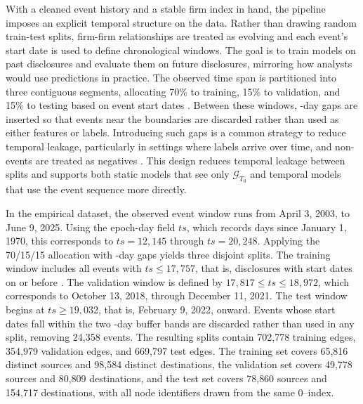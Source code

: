 With a cleaned event history and a stable firm index in hand, the pipeline imposes an explicit temporal structure on the data. Rather than drawing random train-test splits, firm-firm relationships are treated as evolving and each event's start date is used to define chronological windows. The goal is to train models on past disclosures and evaluate them on future disclosures, mirroring how analysts would use predictions in practice. The observed time span is partitioned into three contiguous segments, allocating 70\% to training, 15\% to validation, and 15\% to testing based on event start dates \parencite{goodfellow_deep_2016,xu_inductive_2020}. Between these windows, \InterSplitGap-day gaps are inserted so that events near the boundaries are discarded rather than used as either features or labels. Introducing such gaps is a common strategy to reduce temporal leakage, particularly in settings where labels arrive over time, and non-events are treated as negatives \parencite{bekker_learning_2020}. This design reduces temporal leakage between splits and supports both static models that see only \(\mathcal{G}_{T_0}\) and temporal models that use the event sequence more directly.

In the empirical dataset, the observed event window runs from April 3, 2003, to June 9, 2025. Using the epoch-day field \(\mathit{ts}\), which records days since January 1, 1970, this corresponds to \(\mathit{ts}=12{,}145\) through \(\mathit{ts}=20{,}248\). Applying the 70/15/15 allocation with \InterSplitGap-day gaps yields three disjoint splits. The training window includes all events with \(\mathit{ts} \le 17{,}757\), that is, disclosures with start dates on or before \TrainCutoffDate. The validation window is defined by \(17{,}817 \le \mathit{ts} \le 18{,}972\), which corresponds to October 13, 2018, through December 11, 2021. The test window begins at \(\mathit{ts} \ge 19{,}032\), that is, February 9, 2022, onward. Events whose start dates fall within the two \InterSplitGap-day buffer bands are discarded rather than used in any split, removing 24{,}358 events. The resulting splits contain 702{,}778 training edges, 354{,}979 validation edges, and 669{,}797 test edges. The training set covers 65{,}816 distinct sources and 98{,}584 distinct destinations, the validation set covers 49{,}778 sources and 80{,}809 destinations, and the test set covers 78{,}860 sources and 154{,}717 destinations, with all node identifiers drawn from the same 0--\NumFirmsMinusOne index.

